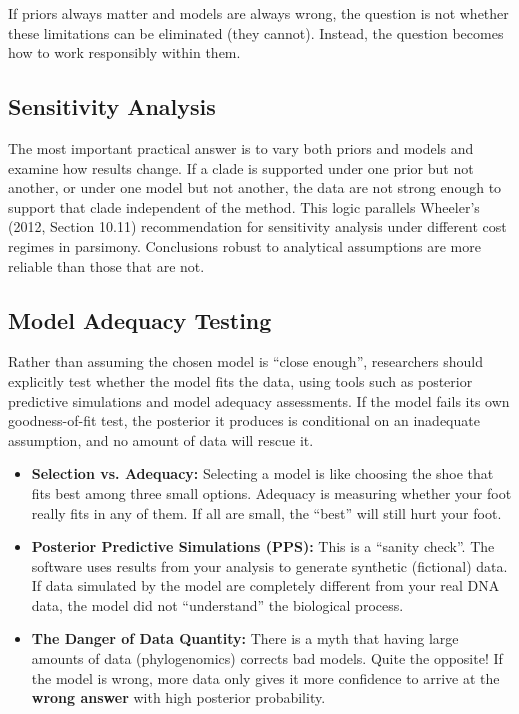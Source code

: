 If priors always matter and models are always wrong, the question is not whether these limitations can be eliminated (they cannot). Instead, the question becomes how to work responsibly within them.

\subsection{Sensitivity Analysis}

The most important practical answer is to vary both priors and models and examine how results change. If a clade is supported under one prior but not another, or under one model but not another, the data are not strong enough to support that clade independent of the method. This logic parallels Wheeler's (2012, Section 10.11) recommendation for sensitivity analysis under different cost regimes in parsimony. Conclusions robust to analytical assumptions are more reliable than those that are not.

\subsection{Model Adequacy Testing}

Rather than assuming the chosen model is ``close enough'', researchers should explicitly test whether the model fits the data, using tools such as posterior predictive simulations and model adequacy assessments. If the model fails its own goodness-of-fit test, the posterior it produces is conditional on an inadequate assumption, and no amount of data will rescue it.

\begin{tcolorbox}[
    colback=red!5!white,
    colframe=red!75!black,
    title=\textbf{The Problem of Model Adequacy},
    arc=2mm
]
\begin{itemize}
    \item \textbf{Selection vs. Adequacy:} Selecting a model is like choosing the shoe that fits best among three small options. Adequacy is measuring whether your foot really fits in any of them. If all are small, the ``best'' will still hurt your foot.
    \item \textbf{Posterior Predictive Simulations (PPS):} This is a ``sanity check''. The software uses results from your analysis to generate synthetic (fictional) data. If data simulated by the model are completely different from your real DNA data, the model did not ``understand'' the biological process.
    \item \textbf{The Danger of Data Quantity:} There is a myth that having large amounts of data (phylogenomics) corrects bad models. Quite the opposite! If the model is wrong, more data only gives it more confidence to arrive at the \textbf{wrong answer} with high posterior probability.
\end{itemize}
\end{tcolorbox}

